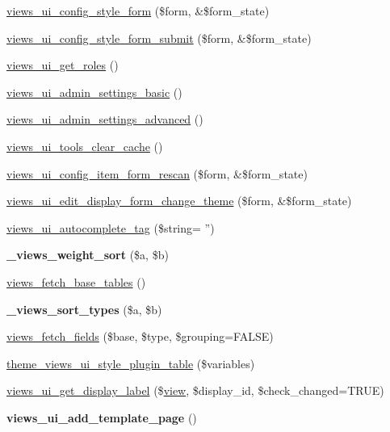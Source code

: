 \begin{DoxyCompactItemize}
\hyperlink{admin_8inc_a481bebc8369cec52e18eb114b9121bab}{views\_\-ui\_\-config\_\-style\_\-form} (\$form, \&\$form\_\-state)
\item 
\hyperlink{admin_8inc_a421a319ebb088e20841e643f67ab1cfe}{views\_\-ui\_\-config\_\-style\_\-form\_\-submit} (\$form, \&\$form\_\-state)
\item 
\hyperlink{admin_8inc_a6c6227b21a8ca8e33eabfe00598410cd}{views\_\-ui\_\-get\_\-roles} ()
\item 
\hyperlink{admin_8inc_a4657997fea8295005c67fe12a3e89e6b}{views\_\-ui\_\-admin\_\-settings\_\-basic} ()
\item 
\hyperlink{admin_8inc_acba3ba9c4723a90c445a86b42e32b178}{views\_\-ui\_\-admin\_\-settings\_\-advanced} ()
\item 
\hyperlink{admin_8inc_a20d738f2a5405c5fbbdbd82954bbf050}{views\_\-ui\_\-tools\_\-clear\_\-cache} ()
\item 
\hyperlink{admin_8inc_a2f6df8066d61dc4f84b6bdbfffc70c1c}{views\_\-ui\_\-config\_\-item\_\-form\_\-rescan} (\$form, \&\$form\_\-state)
\item 
\hyperlink{admin_8inc_a645b4cf556061727a6d09a0d64770b30}{views\_\-ui\_\-edit\_\-display\_\-form\_\-change\_\-theme} (\$form, \&\$form\_\-state)
\item 
\hyperlink{admin_8inc_a1a3a91dbf973532f39cee36c1d99c87b}{views\_\-ui\_\-autocomplete\_\-tag} (\$string= '')
\item 
\hypertarget{admin_8inc_aca9b3ff2e8b27bbde5bfe852a06f8ac6}{
{\bfseries \_\-views\_\-weight\_\-sort} (\$a, \$b)}
\label{admin_8inc_aca9b3ff2e8b27bbde5bfe852a06f8ac6}

\item 
\hyperlink{admin_8inc_a36ed4b1513b45a8a358d2cb3fb287d06}{views\_\-fetch\_\-base\_\-tables} ()
\item 
\hypertarget{admin_8inc_a33087fe4da0c42948a6c0973585ca1cd}{
{\bfseries \_\-views\_\-sort\_\-types} (\$a, \$b)}
\label{admin_8inc_a33087fe4da0c42948a6c0973585ca1cd}

\item 
\hyperlink{admin_8inc_afae9fab40ab9d39b71644d2bb27d2703}{views\_\-fetch\_\-fields} (\$base, \$type, \$grouping=FALSE)
\item 
\hyperlink{admin_8inc_ad4ad8284b228b18c4e1dec545588803e}{theme\_\-views\_\-ui\_\-style\_\-plugin\_\-table} (\$variables)
\item 
\hyperlink{admin_8inc_a20b56808cc1c748e9a5d95b0753367b2}{views\_\-ui\_\-get\_\-display\_\-label} (\$\hyperlink{classview}{view}, \$display\_\-id, \$check\_\-changed=TRUE)
\item 
\hypertarget{admin_8inc_a4e0b8230695d12826b4e150a75e6ff77}{
{\bfseries views\_\-ui\_\-add\_\-template\_\-page} ()}
\label{admin_8inc_a4e0b8230695d12826b4e150a75e6ff77}


\end{DoxyCompactItemize}
